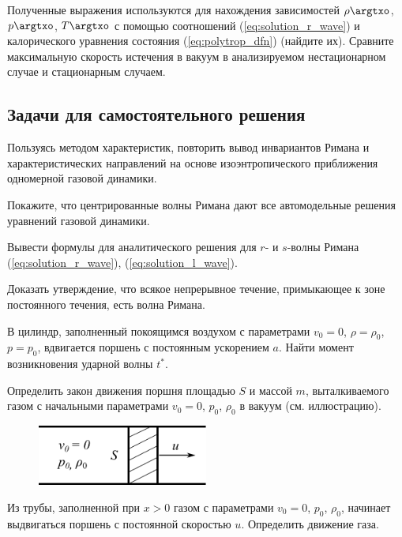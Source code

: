 \documentclass[14pt]{extarticle}
\begin{document}
Полученные выражения используются для нахождения зависимостей $\rho\argtxo$, $p\argtxo$, $T\argtxo$ с помощью соотношений (\ref{eq:solution_r_wave}) и калорического уравнения состояния (\ref{eq:polytrop_dfn}) (найдите их). Сравните максимальную скорость истечения в вакуум в анализируемом нестационарном случае и стационарным случаем.

\subsection{Задачи для самостоятельного решения}

\begin{problems}
	
	\item 
	Пользуясь методом характеристик, повторить вывод инвариантов Римана и характеристических направлений на основе изоэнтропического приближения одномерной газовой динамики.
	
	\item 
	Покажите, что центрированные волны Римана дают все автомодельные решения уравнений газовой динамики.	
	
	\item 
	Вывести формулы для аналитического решения для $r$- и $s$-волны Римана (\ref{eq:solution_r_wave}), (\ref{eq:solution_l_wave}).

	\item 
	Доказать утверждение, что всякое непрерывное течение, примыкающее к зоне постоянного течения, есть волна Римана.
	
	
	
	
	\item 
	В цилиндр, заполненный покоящимся воздухом с параметрами $v_0 = 0$, $\rho=\rho_0$, $p=p_0$, вдвигается поршень с постоянным ускорением $a$. Найти момент возникновения ударной волны $t^*$.
	
	\item
	Определить закон движения поршня площадью $S$ и массой $m$, выталкиваемого газом с начальными параметрами $v_0=0$, $p_0$, $\rho_0$ в вакуум (см. иллюстрацию).

	\begin{figure}[h!]
		\centering
		\includegraphics[width=0.5\textwidth]{../img/piston_u.pdf}
	\end{figure}
	
	\item 
	Из трубы, заполненной при $x>0$ газом с параметрами  $v_0=0$, $p_0$, $\rho_0$, начинает выдвигаться поршень с постоянной скоростью $u$. Определить движение газа.

\end{problems}
\end{document}
